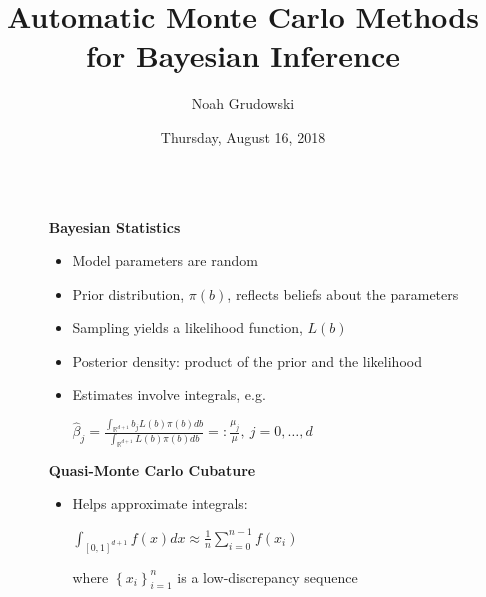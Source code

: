 \documentclass[final,mathserif]{beamer}
\title{Automatic Monte Carlo Methods for Bayesian Inference}
\author{Noah Grudowski}
\institute{Applied Mathematics, Illinois Institute of
Technology}
\date{Thursday, August 16, 2018}
\newcommand{\blue}[1]{{\color{myblue}#1}}
\renewcommand{\blue}{\textcolor{blue!80!black}}
\begin{document}
\vspace*{-1.5ex}
\begin{frame}[fragile]

\begin{columns}[t]

\begin{column}{.02\linewidth}\end{column} %

\begin{column}{.31\linewidth} %

\begin{block}{\Large \textbf{\blue {Bayesian Statistics}}}
\vspace{.1in}
\begin{itemize}
\item Model parameters are random
\item \alert{Prior} distribution, $\pi(b)$, reflects beliefs about the parameters
\item Sampling yields a likelihood function, $L(b)$
\item \alert{Posterior} density: product of the prior and the likelihood
\item Estimates involve integrals, e.g. 

\vspace{.1in}

$\hat{\beta}_j=\frac{\int_{\mathbb{R}^{d+1}}b_jL(b)\pi(b)db}{\int_{\mathbb{R}^{d+1}}L(b)\pi(b)db} =: \frac{\mu_j}{\mu},\  j=0, \ldots, d$

\vspace{.1in}

\end{itemize}
\end{block}

\vspace{.1in}

\begin{block} {\Large \textbf{\blue {Quasi-Monte Carlo Cubature}}}
\vspace{.1in}
\begin{itemize}
\item Helps approximate integrals:

\vspace{0.1in}

$\int_{[0, 1]^{d+1}}f(x)dx\approx \frac{1}{n} \sum_{i=0}^{n-1}f({x_i})$ 

\vspace{.1in}

where $\left\{x_i\right\}_{i=1}^n$ is a low-discrepancy sequence


\end{itemize}
\end{block}
\end{column}
\end{columns}
\end{frame}
\end{document}
